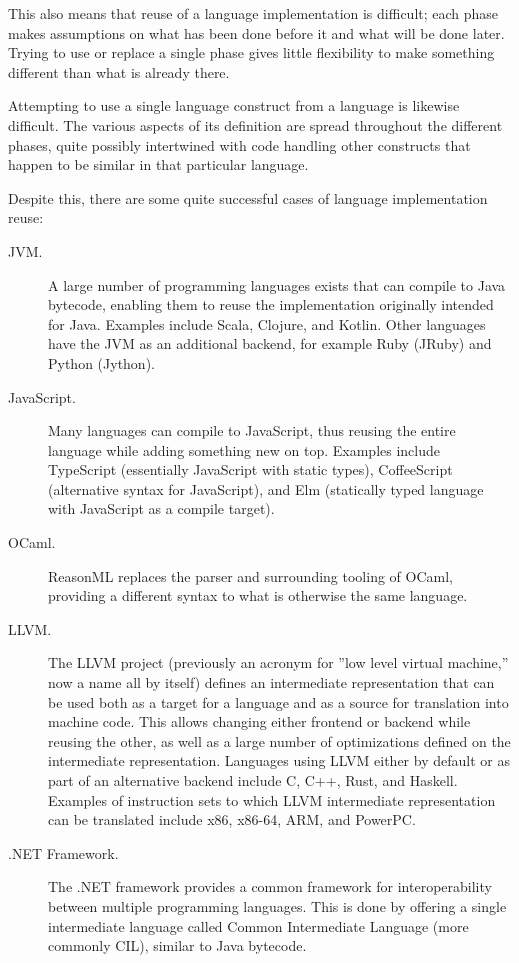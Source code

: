 \documentclass{kththesis}
\begin{document}
This also means that reuse of a language implementation is difficult; each phase makes assumptions on what has been done before it and what will be done later. Trying to use or replace a single phase gives little flexibility to make something different than what is already there.

Attempting to use a single language construct from a language is likewise difficult. The various aspects of its definition are spread throughout the different phases, quite possibly intertwined with code handling other constructs that happen to be similar in that particular language.

Despite this, there are some quite successful cases of language implementation reuse:

\begin{description}
  \item[JVM.] A large number of programming languages exists that can compile to Java bytecode, enabling them to reuse the implementation originally intended for Java. Examples include Scala, Clojure, and Kotlin. Other languages have the JVM as an additional backend, for example Ruby (JRuby) and Python (Jython). %
  \item[JavaScript.] Many languages can compile to JavaScript, thus reusing the entire language while adding something new on top. Examples include TypeScript (essentially JavaScript with static types), CoffeeScript (alternative syntax for JavaScript), and Elm (statically typed language with JavaScript as a compile target).
  \item[OCaml.] ReasonML replaces the parser and surrounding tooling of OCaml, providing a different syntax to what is otherwise the same language.
  \item[LLVM.] The LLVM project (previously an acronym for ''low level virtual machine,'' now a name all by itself) defines an intermediate representation that can be used both as a target for a language and as a source for translation into machine code. This allows changing either frontend or backend while reusing the other, as well as a large number of optimizations defined on the intermediate representation. Languages using LLVM either by default or as part of an alternative backend include C, C++, Rust, and Haskell. Examples of instruction sets to which LLVM intermediate representation can be translated include x86, x86-64, ARM, and PowerPC.

  \item[.NET Framework.] The .NET framework provides a common framework for interoperability between multiple programming languages. This is done by offering a single intermediate language called Common Intermediate Language (more commonly CIL), similar to Java bytecode.
\end{description}
\end{document}
